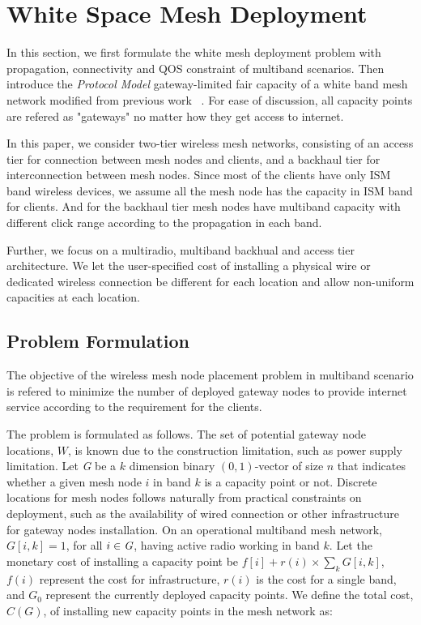 \section{White Space Mesh Deployment}
\label{sec:model}

In this section, we first formulate the 
white mesh deployment problem
with propagation, connectivity and QOS constraint of multiband scenarios.
Then introduce the \emph{Protocol Model} gateway-limited fair capacity of a white band mesh network modified from previous work ~\cite{robinson2008adding}. 
For ease of discussion, all capacity points are refered as "gateways" no matter how they get access to internet.

In this paper, we consider two-tier wireless mesh networks, consisting of an access tier for connection between mesh nodes and clients, and a backhaul tier for interconnection between mesh nodes. 
Since most of the clients have only ISM band wireless devices, we assume all the mesh node has the capacity in ISM band for clients. And for the backhaul tier mesh nodes have multiband capacity with different click range according to the propagation in each band.

Further, we focus on a multiradio, multiband backhual and access tier architecture. We let the user-specified cost of installing a physical wire or dedicated wireless connection be different for each location and allow non-uniform capacities at each location.
 

\subsection{Problem Formulation}
The objective of the wireless mesh node placement problem in multiband scenario is refered to
minimize the number of deployed gateway nodes to provide internet service according to the requirement for the clients. 

The problem is formulated as follows.
The set of potential gateway node locations, $W$, is known due to the construction limitation, such as power supply limitation. 
Let \emph{G} be a $k$ dimension binary $(0,1)$-vector of size $n$ that indicates whether a given mesh node $i$ in band $k$ is a capacity point or not. 
Discrete locations for mesh nodes follows naturally from practical constraints on deployment, such as the availability of wired connection or other infrastructure for gateway nodes installation.
On an operational multiband mesh network, $G[i,k]=1$, for all $i\in \emph{G}$, having active radio working in band $k$. Let the monetary cost of installing a capacity point be $f[i]+r(i)\times \sum_kG[i,k]$, $f(i)$ represent the cost for infrastructure, $r(i)$ is the cost for a single band, and \emph{$G_0$} represent the currently deployed capacity points.
We define the total cost, $C(G)$, of installing new capacity points in the mesh network as:


